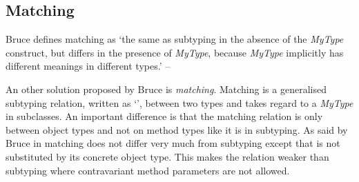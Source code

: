 %
%

\subsection{Matching}
\label{subsec:matching}
\begin{prop}[Matching]
	\label{prop:matching}
	Bruce defines matching as `the same as subtyping in the absence
	of the \emph{MyType} construct, but differs in the presence of
	\emph{MyType}, because \emph{MyType} implicitly has different
	meanings in different types.' -- \cite{bruce_foundations_2002}
\end{prop}

An other solution proposed by Bruce \cite{bruce_binary_1995} is
\emph{matching}. Matching is a generalised subtyping relation, written
as `\match', between two types and takes regard to a \emph{MyType} in
subclasses. An important difference is that the matching relation is only
between object types and not on method types like it is in subtyping. As
said by Bruce in \cite{bruce_foundations_2002} matching does not differ
very much from subtyping except that \mytype is not substituted by its
concrete object type. This makes the relation weaker than subtyping
where contravariant method parameters are not allowed.

\begin{defn}[Matching]
	\label{defn:matching}
\end{defn}


